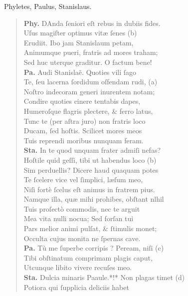 \documentclass[a4paper,12pt]{article}
\begin{document}
Phyletes, Paulus, Stanislaus.
\begin{verse}
\textbf{Phy.} DAnda ſeniori eſt rebus in dubiis fides.\\[0pt]
Uſus magiſter optimus vitæ ſenes (b)\footnotemark\\[0pt]
Erudiit. Ibo jam Stanislaum petam,\\[0pt]
Animumque pueri, fratris ad mores traham;\\[0pt]
Sed huc uterque graditur. O factum bene!\\[0pt]
\textbf{Pa.} Audi Stanislaẽ. Quoties vili ſago\\[0pt]
Te, ſeu lacerna ſordidum oſfendam rudi, (a)\footnotemark\\[0pt]
Noſtro indecoram generi inurentem notam;\\[0pt]
Condire quoties cinere tentabis dapes,\\[0pt]
Humeroſque flagris plectere, \& ferro latus,\\[0pt]
Tunc te (per aſtra juro) non fratris loco\\[0pt]
Ducam, ſed hoſtis. Scilicet mores meos\\[0pt]
Tuis reprendi moribus nunquam feram.\\[0pt]
\textbf{Sta.} In te quod unquam frater admiſi nefas?\\[0pt]
Hoſtile quid geſſi, tibi ut habendus loco (b)\footnotemark\\[0pt]
Sim perduellis? Dicere haud quaquam potes\\[0pt]
Te ſcelere vice vel ſimplici, læſum meo,\\[0pt]
Niſi fortè ſcelus eſt animus in fratrem pius.\\[0pt]
Namque illa, quæ mihi prohibes, obſtant nlhil\\[0pt]
Tuis proſectò commodis, nec te arguit\\[0pt]
Mea vita nulli nocua; Sed forſan tui\\[0pt]
Pars melior animi pulſat, \& ſtimulis monet;\\[0pt]
Occulta cujus monita ne ſpernas cave.\\[0pt]
\textbf{Pa.} Tù me ſuperbe corripis ? Peream, niſi (c)\footnotemark\\[0pt]
Tibi obſtinatum comprimam plagis caput,\\[0pt]
Utcunque libito vivere recuſes meo.\\[0pt]
\textbf{Sta.} Dulcia minaris Paaule.*!* Non plagas timet (d)\footnotemark\\[0pt]
Potiora qui ſupplicia deliciis habet\\[0pt]

\end{verse}
\end{document}
